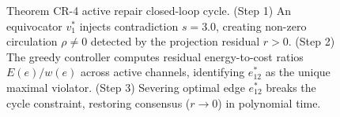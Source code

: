 \begin{figure}[htbp]
\caption{Theorem CR-4 active repair closed-loop cycle. (Step 1) An equivocator $v_1^*$ injects contradiction $s = 3.0$, creating non-zero circulation $\rho \ne 0$ detected by the projection residual $r > 0$. (Step 2) The greedy controller computes residual energy-to-cost ratios $E(e)/w(e)$ across active channels, identifying $e_{12}^*$ as the unique maximal violator. (Step 3) Severing optimal edge $e_{12}^*$ breaks the cycle constraint, restoring consensus ($r \to 0$) in polynomial time.}
\label{fig:repair}
\end{figure}
